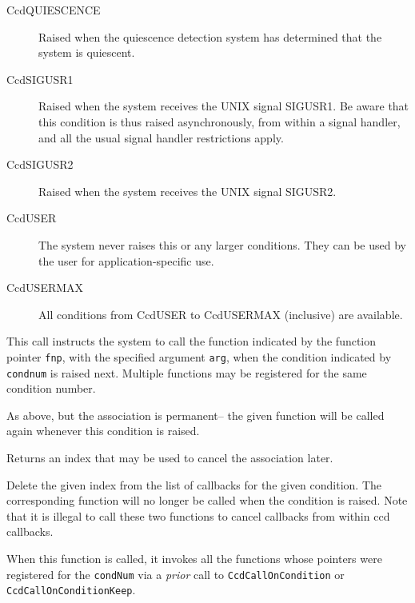 \begin{description}
\item[CcdQUIESCENCE] Raised when the quiescence detection system
has determined that the system is quiescent.
\item[CcdSIGUSR1] Raised when the system receives the UNIX signal SIGUSR1.
Be aware that this condition is thus raised asynchronously, from
within a signal handler, and all the usual signal handler restrictions apply.
\item[CcdSIGUSR2] Raised when the system receives the UNIX signal SIGUSR2.
\item[CcdUSER] The system never raises this or any larger conditions.
They can be used by the user for application-specific use.
\item[CcdUSERMAX] All conditions from CcdUSER to CcdUSERMAX (inclusive) are available.
\end{description}


This call instructs the system to call the function indicated by the
function pointer {\tt fnp}, with the specified argument {\tt arg}, when the
condition indicated by {\tt condnum} is raised next. Multiple functions may
be registered for the same condition number.

As above, but the association is permanent-- the given function will
be called again whenever this condition is raised.

Returns an index that may be used to cancel the association later.

Delete the given index from the list of callbacks for
the given condition. The corresponding function will no longer be 
called when the condition is raised.
Note that it is illegal to call these two functions to cancel callbacks from within ccd callbacks.


When this function is called, it invokes all the functions whose
pointers were registered for the \verb#condNum# via a {\em prior} call
to {\tt CcdCallOnCondition} or {\tt CcdCallOnConditionKeep}.  


